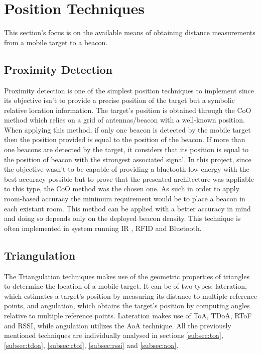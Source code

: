 \section{Position Techniques}
\label{sec:techniques}

This section's focus is on the available means of obtaining distance measurements from a mobile target to a beacon.  

\subsection{Proximity Detection}
\label{subsec:prox}

Proximity detection is one of the simplest position techniques to implement since its objective isn't to provide a precise position of the target but a symbolic relative location information. The target's position is obtained through the \ac{CoO} method which relies on a grid of antennas/beacon with a well-known position. When applying this method, if only one beacon is detected by the mobile target then the position provided is equal to the position of the beacon. If more than one beacons are detected by the target, it considers that its position is equal to the position of beacon with the strongest associated signal. In this project, since the objective wasn't to be capable of providing a bluetooth low energy with the best accuracy possible but to prove that the presented architecture was appliable to this type, the \ac{CoO} method was the chosen one. As such in order to apply room-based accuracy the minimum requirement would be to place a beacon in each existant room. This method can be applied with a better accuracy in mind and doing so depends only on the deployed beacon density. This technique is often implemented in system running \ac{IR} , \ac{RFID} and Bluetooth.

\subsection{Triangulation}
\label{subsec:tri}

The Triangulation techniques makes use of the geometric properties of triangles to determine the location of a mobile target. It can be of two types: lateration, which estimates a target's position by measuring its distance to multiple reference points, and angulation, which obtains the target's position by computing angles relative to multiple reference points. Lateration makes use of \ac{ToA}, \ac{TDoA}, \ac{RToF} and \ac{RSSI}, while angulation utilizes the \ac{AoA} technique. All the previously mentioned techniques are individually analysed in sections \ref{subsec:toa}, \ref{subsec:tdoa}, \ref{subsec:rtof}, \ref{subsec:rssi} and \ref{subsec:aoa}. 

